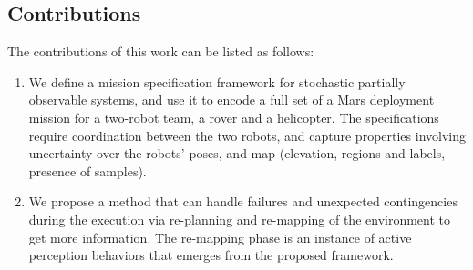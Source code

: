 \documentclass[letterpaper]{article} %
\begin{document}
	\subsection{Contributions}
	The contributions of this work can be listed as follows:
	\begin{enumerate}
	
	\item We define a mission specification framework for stochastic partially observable systems, and 
	use it to encode a full set of a Mars deployment mission for a two-robot team, a rover and a helicopter.
	The specifications require coordination between the two robots, and capture properties involving
	uncertainty over the robots' poses, and map (elevation, regions and labels, presence of samples).
	
	
	
	
	
	\item We propose a method that can handle failures and unexpected contingencies during the execution via re-planning and re-mapping of the environment to get more information. The re-mapping phase is an instance of active perception behaviors that emerges from the proposed framework.
	
	

\end{enumerate}
\end{document}
